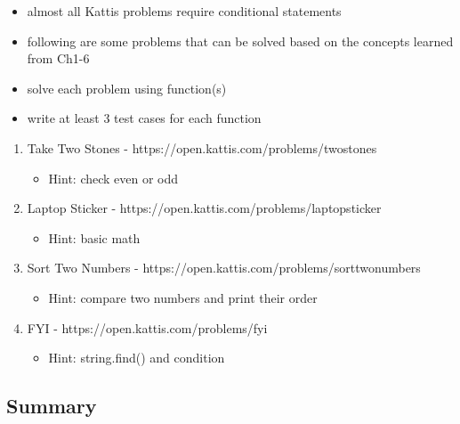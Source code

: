 \documentclass[11pt]{article}
\providecommand{\tightlist}{%
      \setlength{\itemsep}{0pt}\setlength{\parskip}{0pt}}
\begin{document}
\begin{itemize}
\tightlist
\item
  almost all Kattis problems require conditional statements
\item
  following are some problems that can be solved based on the concepts
  learned from Ch1-6
\item
  solve each problem using function(s)
\item
  write at least 3 test cases for each function
\end{itemize}

\begin{enumerate}
\def\labelenumi{\arabic{enumi}.}
\tightlist
\item
  Take Two Stones - https://open.kattis.com/problems/twostones

  \begin{itemize}
  \tightlist
  \item
    Hint: check even or odd
  \end{itemize}
\item
  Laptop Sticker - https://open.kattis.com/problems/laptopsticker

  \begin{itemize}
  \tightlist
  \item
    Hint: basic math
  \end{itemize}
\item
  Sort Two Numbers - https://open.kattis.com/problems/sorttwonumbers

  \begin{itemize}
  \tightlist
  \item
    Hint: compare two numbers and print their order
  \end{itemize}
\item
  FYI - https://open.kattis.com/problems/fyi

  \begin{itemize}
  \tightlist
  \item
    Hint: string.find() and condition
  \end{itemize}
\end{enumerate}

    \hypertarget{summary}{%
\subsection{Summary}\label{summary}}
\end{document}
